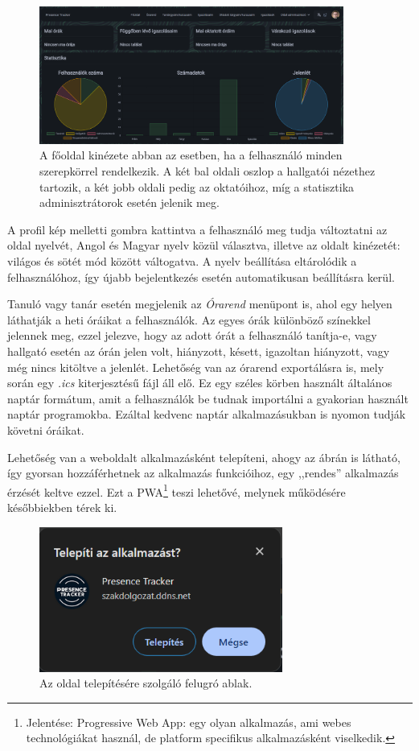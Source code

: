 \documentclass[
]{thesis-ekf}
\theoremstyle{definition}
\theoremstyle{remark}
\begin{document}
\begin{figure}[ht!]
	\centering
	\includegraphics[width=10cm]{../pictures/screenshots/landing.png}
	\caption{A főoldal kinézete abban az esetben, ha a felhasználó minden szerepkörrel rendelkezik. A két bal oldali oszlop a hallgatói nézethez tartozik, a két jobb oldali pedig az oktatóihoz, míg a statisztika adminisztrátorok esetén jelenik meg.}
	\label{landing}
\end{figure}

A profil kép melletti gombra kattintva a felhasználó meg tudja változtatni az oldal nyelvét, Angol és Magyar nyelv közül választva, illetve az oldalt kinézetét: világos és sötét mód között váltogatva. A nyelv beállítása eltárolódik a felhasználóhoz, így újabb bejelentkezés esetén automatikusan beállításra kerül.

Tanuló vagy tanár esetén megjelenik az \emph{Órarend} menüpont is, ahol egy helyen láthatják a heti óráikat a felhasználók. Az egyes órák különböző színekkel jelennek meg, ezzel jelezve, hogy az adott órát a felhasználó tanítja-e, vagy hallgató esetén az órán jelen volt, hiányzott, késett, igazoltan hiányzott, vagy még nincs kitöltve a jelenlét. Lehetőség van az órarend exportálásra is, mely során egy \emph{.ics} kiterjesztésű fájl áll elő. Ez egy széles körben használt általános naptár formátum, amit a felhasználók be tudnak importálni a gyakorian használt naptár programokba\cite{ICS}. Ezáltal kedvenc naptár alkalmazásukban is nyomon tudják követni óráikat.

Lehetőség van a weboldalt alkalmazásként telepíteni, ahogy az  ábrán is látható, így gyorsan hozzáférhetnek az alkalmazás funkcióihoz, egy ,,rendes'' alkalmazás érzését keltve ezzel. Ezt a PWA\footnote{Jelentése: Progressive Web App: egy olyan alkalmazás, ami webes technológiákat használ, de platform specifikus alkalmazásként viselkedik.\cite{PWA}} teszi lehetővé, melynek működésére későbbiekben térek ki.

\begin{figure}[ht!]
	\centering
	\includegraphics[width=8cm]{../pictures/screenshots/install.png}
	\caption{Az oldal telepítésére szolgáló felugró ablak.}
	\label{install}
\end{figure}
\end{document}
